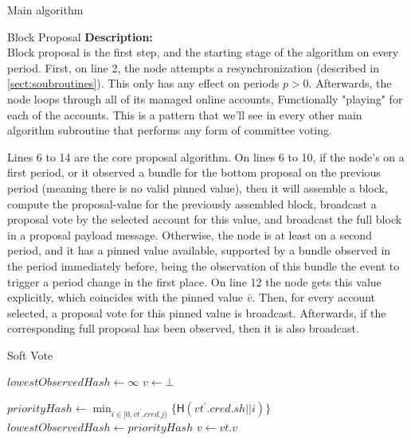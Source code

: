 \documentclass[10pt,a4paper]{article}
\begin{document}
\begin{section}{Main algorithm}
\begin{subsection}{Block Proposal}
\newpage
\noindent \textbf{Description:}\\
Block proposal is the first step, and the starting stage of the algorithm on every period.
First, on line 2, the node attempts a resynchronization (described in \ref{sect:soubroutines}). 
This only has any effect on periods $p > 0$.
Afterwards, the node loops through all of its managed online accounts, Functionally
"playing" for each of the accounts. This is a pattern that we'll see in every other
main algorithm subroutine that performs any form of committee voting.

Lines 6 to 14 are the core proposal algorithm. On lines 6 to 10, 
if the node's on a first period, or it observed a bundle for the bottom proposal on the previous 
period (meaning there is no valid pinned value), then it will assemble a block, compute the proposal-value for the 
previously assembled block, broadcast a proposal vote by the selected account for this value, and 
broadcast the full block in a proposal payload message.
Otherwise, the node is at least on a second period, and it has a pinned value available, supported by a 
bundle observed in the period immediately before, being the observation of this bundle the event to trigger 
a period change in the first place. On line 12 the node gets this value explicitly, which coincides with the pinned
value $\bar{v}$. 
Then, for every account selected, a proposal vote for this pinned value is broadcast. Afterwards, 
if the corresponding full proposal has been observed, then it is also broadcast.


\end{subsection}
\begin{subsection}{Soft Vote}\label{ssect:softvote}

\begin{algorithm}[H]
    \caption{\underline{Soft Vote}}
    \label{algo:soft-vote}
    \begin{algorithmic}[1]
    \State $lowestObservedHash \gets \infty$
    \State $v \gets \bot$ 

        \State $priorityHash \gets \min_{i \in [0, vt^\prime.cred.j)} \{ \mathsf{H}(vt^\prime.cred.sh || i)\}$
            \State $lowestObservedHash \gets priorityHash$
            \State $v \gets vt.v$
        \EndIf    
    \EndFor


\end{algorithmic}
\end{algorithm}
\end{subsection}
\end{section}
\end{document}
